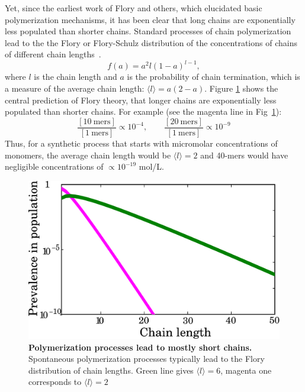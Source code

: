 \documentclass[journal=jacsat,manuscript=article,layout=twocolumn]{achemso}
\newcommand*{\pq}[1]{\left[ #1 \right]}
\begin{document}
 Yet, since the earliest work of Flory and others, which elucidated basic polymerization mechanisms, 
it has been clear that long chains are exponentially less populated than shorter chains.  Standard 
processes of chain polymerization lead to the the Flory or Flory-Schulz distribution of the 
concentrations of chains of different chain 
lengths~\cite{Flory1953}. 
\begin{equation}
 f(a)=a^2l(1-a)^{l-1},\label{eq:flory}
\end{equation} 
where $l$ is the chain length and $a$ is the probability of chain termination, 
which is a measure of the average chain length: $\langle l \rangle = a(2- a)$.
Figure \ref{fig:flory} shows the central prediction of Flory theory, that 
longer chains are exponentially less populated than shorter chains.  For example (see the magenta 
line 
in Fig~\ref{fig:flory}):
\begin{equation}  
\frac{\pq{10~\mathrm{mers}}}{\pq{1~\mathrm{mers}}}\propto10^{-4},\qquad\frac{\pq{20~\mathrm{mers}}}
{
\pq{1~\mathrm{mers}}}\propto10^{-9}
\end{equation} 
Thus, for a synthetic process that starts with micromolar concentrations of monomers, the 
average chain length would be $\langle l \rangle = 2$ and 40-mers would have 
negligible concentrations of $\propto 10^{-19} $ mol/L. 
\begin{figure}[h!]
  \centering
  \includegraphics[width=\columnwidth]{pictures/flory2.pdf} 
  \caption{\textbf{Polymerization processes lead to mostly short chains.}  Spontaneous 
polymerization processes typically lead to the Flory distribution of chain lengths. 
Green line gives $\langle  l \rangle= 6$, magenta one corresponds to $\langle l \rangle=2$}
  \label{fig:flory}
\end{figure}
\end{document}

